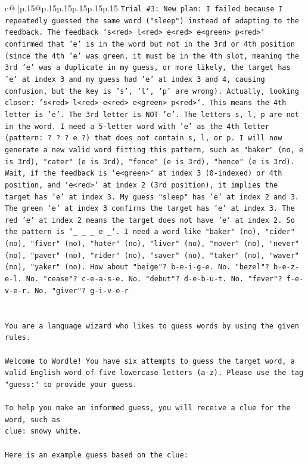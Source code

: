 \documentclass{article}
\begin{document}
{\begin{supertabular}{c@{$\;$}|p{.15\linewidth}@{}p{.15\linewidth}p{.15\linewidth}p{.15\linewidth}p{.15\linewidth}p{.15\linewidth}}
{{{\texttt{Trial \#3: New plan: I failed because I repeatedly guessed the same word ("sleep") instead of adapting to the feedback. The feedback `s<red> l<red> e<red> e<green> p<red>` confirmed that 'e' is in the word but not in the 3rd or 4th position (since the 4th 'e' was green, it must be in the 4th slot, meaning the 3rd 'e' was a duplicate in my guess, or more likely, the target has 'e' at index 3 and my guess had 'e' at index 3 and 4, causing confusion, but the key is 's', 'l', 'p' are wrong). Actually, looking closer: `s<red> l<red> e<red> e<green> p<red>`. This means the 4th letter is 'e'. The 3rd letter is NOT 'e'. The letters s, l, p are not in the word. I need a 5{-}letter word with 'e' as the 4th letter (pattern: ? ? ? e ?) that does not contain s, l, or p. I will now generate a new valid word fitting this pattern, such as "baker" (no, e is 3rd), "cater" (e is 3rd), "fence" (e is 3rd), "hence" (e is 3rd). Wait, if the feedback is `e<green>` at index 3 (0{-}indexed) or 4th position, and `e<red>` at index 2 (3rd position), it implies the target has 'e' at index 3. My guess "sleep" has 'e' at index 2 and 3. The green 'e' at index 3 confirms the target has 'e' at index 3. The red 'e' at index 2 means the target does not have 'e' at index 2. So the pattern is `\_ \_ \_ e \_`. I need a word like "baker" (no), "cider" (no), "fiver" (no), "hater" (no), "liver" (no), "mover" (no), "never" (no), "paver" (no), "rider" (no), "saver" (no), "taker" (no), "waver" (no), "yaker" (no). How about "beige"? b{-}e{-}i{-}g{-}e. No. "bezel"? b{-}e{-}z{-}e{-}l. No. "cease"? c{-}e{-}a{-}s{-}e. No. "debut"? d{-}e{-}b{-}u{-}t. No. "fever"? f{-}e{-}v{-}e{-}r. No. "giver"? g{-}i{-}v{-}e{-}r} \\
\\ 
\\ 
\texttt{You are a language wizard who likes to guess words by using the given rules.} \\
\\ 
\texttt{Welcome to Wordle! You have six attempts to guess the target word, a valid English word of five lowercase letters (a{-}z). Please use the tag "guess:" to provide your guess.} \\
\\ 
\texttt{To help you make an informed guess, you will receive a clue for the word, such as} \\
\texttt{clue: snowy white.} \\
\\ 
\texttt{Here is an example guess based on the clue: } \\
}}}
\end{supertabular}}
\end{document}

